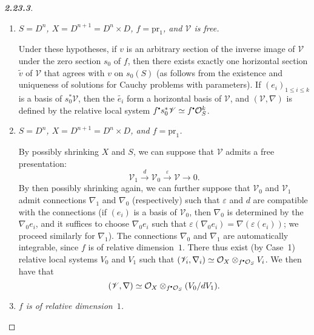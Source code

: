 \documentclass{report}
\newcommand{\scr}[1]{{\mathscr{#1}}}
\renewcommand{\cal}[1]{{\mathcal{#1}}}
\newcommand{\sbullet}{{\mathbin{\vcenter{\hbox{\scalebox{.5}{$\bullet$}}}}}}
\newcommand{\pr}{\mathrm{pr}}
\renewcommand{\leq}{\leqslant}
\newcommand{\oldpage}[1]{\marginpar{\footnotesize$\Big\vert$ \textit{p.~#1}}}
\begin{document}
\begin{proof}[\normalfont\textbf{2.23.3}]
  \begin{enumerate}[\bf {Case}~1:]
    \item \emph{$S=D^n$, $X=D^{n+1}=D^n\times D$, $f=\pr_1$, and $\scr{V}$ is free.}

      Under these hypotheses, if $v$ is an arbitrary section of the inverse image of $\scr{V}$ under the zero section $s_0$ of $f$, then there exists exactly one horizontal section $\widetilde{v}$ of $\scr{V}$ that agrees with $v$ on $s_0(S)$ (as follows from the existence and uniqueness of solutions for Cauchy problems with parameters).
      If $(e_i)_{1\leq i\leq k}$ is a basis of $s_0^*\scr{V}$, then the $\widetilde{e_i}$ form a horizontal basis of $\scr{V}$, and $(\scr{V},{\nabla})$ is defined by the relative local system $f^\sbullet s_0^*\scr{V}\simeq f^\sbullet\cal{O}_S^k$.
    \item \emph{$S=D^n$, $X=D^{n+1}=D^n\times D$, and $f=\pr_1$.}

      By possibly shrinking $X$ and $S$, we can suppose that $\scr{V}$ admits a free presentation:
      \[
        \scr{V}_1 \xrightarrow{d} \scr{V}_0 \xrightarrow{\varepsilon} \scr{V} \to 0.
      \]
      By then possibly shrinking again, we can further suppose that $\scr{V}_0$ and $\scr{V}_1$ admit connections $\nabla_1$ and $\nabla_0$ (respectively) such that $\varepsilon$ and $d$ are compatible with the connections (if $(e_i)$ is a basis of $\scr{V}_0$, then $\nabla_0$ is determined by the $\nabla_0 e_i$, and it suffices to choose $\nabla_0 e_i$ such that $\varepsilon(\nabla_0 e_i)=\nabla(\varepsilon(e_i))$; we proceed similarly for $\nabla_1$).
      The connections $\nabla_0$ and $\nabla_1$ are automatically integrable, since $f$ is of relative dimension~$1$.
      There thus exist (by Case~1) relative local systems $V_0$ and $V_1$ such that $(\scr{V}_i,\nabla_i)\simeq\cal{O}_X\otimes_{f^\sbullet\cal{O}_S}V_i$.
      We then have that
      \[
        (\scr{V},\nabla) \simeq \cal{O}_X\otimes_{f^\sbullet\cal{O}_S}(V_0/dV_1).
      \]
\oldpage{18}
    \item \emph{$f$ is of relative dimension~$1$.}


\end{enumerate}
\end{proof}
\end{document}
